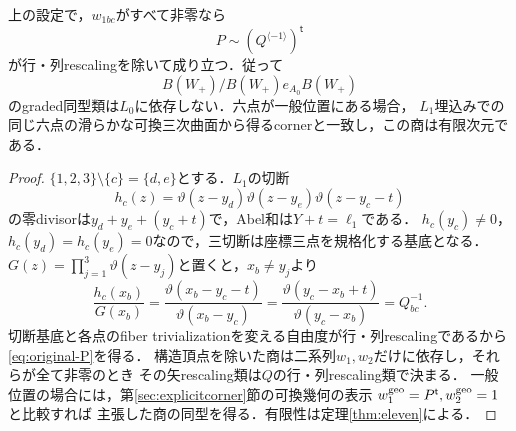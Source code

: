 \begin{theorem}[元の六点によるcornerの復元]\label{thm:original-six-points}
上の設定で，$w_{1bc}$がすべて非零なら
\begin{equation}\label{eq:original-P}
 P\sim (Q^{\langle-1\rangle})^{\mathsf t}
\end{equation}
が行・列rescalingを除いて成り立つ．従って
\[
 B(W_+)/B(W_+)e_{A_0}B(W_+)
\]
のgraded同型類は$L_0$に依存しない．六点が一般位置にある場合，
$L_1$埋込みでの同じ六点の滑らかな可換三次曲面から得るcornerと一致し，この商は有限次元である．
\end{theorem}
\begin{proof}
$\{1,2,3\}\setminus\{c\}=\{d,e\}$とする．$L_1$の切断
\[
 h_c(z)=\vartheta(z-y_d)\vartheta(z-y_e)\vartheta(z-y_c-t)
\]
の零divisorは$y_d+y_e+(y_c+t)$で，Abel和は$Y+t=\ell_1$である．
$h_c(y_c)\ne0$，$h_c(y_d)=h_c(y_e)=0$なので，三切断は座標三点を規格化する基底となる．
$G(z)=\prod_{j=1}^3\vartheta(z-y_j)$と置くと，$x_b\ne y_j$より
\[
 \frac{h_c(x_b)}{G(x_b)}
 =\frac{\vartheta(x_b-y_c-t)}{\vartheta(x_b-y_c)}
 =\frac{\vartheta(y_c-x_b+t)}{\vartheta(y_c-x_b)}=Q_{bc}^{-1}.
\]
切断基底と各点のfiber trivializationを変える自由度が行・列rescalingであるから
\eqref{eq:original-P}を得る．
構造頂点を除いた商は二系列$w_1,w_2$だけに依存し，それらが全て非零のとき
その矢rescaling類は$Q$の行・列rescaling類で決まる．
一般位置の場合には，第\ref{sec:explicitcorner}節の可換幾何の表示
$w_1^{\rm geo}=P^{\mathsf t},w_2^{\rm geo}=1$と比較すれば
主張した商の同型を得る．有限性は定理\ref{thm:eleven}による．
\end{proof}

